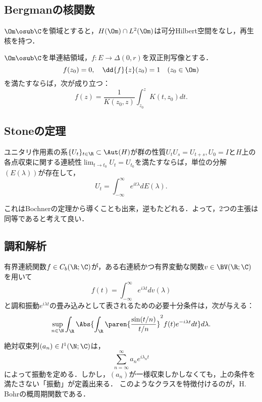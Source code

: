 \documentclass[uplatex,dvipdfmx]{jsreport}
\begin{document}
\subsection{Bergmanの核関数}

\begin{definition}
    $\Om\osub\C$を領域とすると，$H(\Om)\cap L^2(\Om)$は可分Hilbert空間をなし，再生核を持つ．
\end{definition}

\begin{theorem}
    $\Om\osub\C$を単連結領域，$f:E\to\Delta(0,r)$を双正則写像とする．
    \[f(z_0)=0,\quad\dd{f}{z}(z_0)=1\quad(z_0\in\Om)\]
    を満たすならば，次が成り立つ：
    \[f(z)=\frac{1}{K(z_0,z)}\int^z_{z_0}K(t,z_0)dt.\]
\end{theorem}

\subsection{Stoneの定理}

\begin{theorem}[Stone]
    ユニタリ作用素の系$\{U_t\}_{t\in\R}\subset\Aut(H)$が群の性質$U_tU_s=U_{t+s},U_0=I$と$H$上の各点収束に関する連続性$\lim_{t\to t_0}U_t=U_{t_0}$を満たすならば，単位の分解$(E(\lambda))$が存在して，
    \[U_t=\int^\infty_{-\infty}e^{it\lambda}dE(\lambda).\]
\end{theorem}
\begin{remarks}
    これはBochnerの定理から導くことも出来，逆もたどれる．よって，2つの主張は同等であると考えて良い\cite{吉田}．
\end{remarks}

\subsection{調和解析}

\begin{theorem}
    有界連続関数$f\in C_b(\R;\C)$が，ある右連続かつ有界変動な関数$v\in\BV(\R;\C)$を用いて
    \[f(t)=\int^\infty_{-\infty}e^{i\lambda t}dv(\lambda)\]
    と調和振動$e^{i\lambda t}$の畳み込みとして表されるための必要十分条件は，次が与える：
    \[\sup_{n\in\N}\int_\R\Abs{\int_\R\paren{\frac{\sin(t/n)}{t/n}}^2f(t)e^{-i\lambda t}dt}d\lambda.\]
\end{theorem}
\begin{remarks}
    絶対収束列$(a_n)\in l^1(\N;\C)$は，
    \[\sum_{n=\infty}^\infty a_ne^{i\lambda_nt}\]
    によって振動を定める．しかし，$(a_n)$が一様収束しかしなくても，上の条件を満たさない「振動」が定義出来る．
    このようなクラスを特徴付けるのが，H. Bohrの概周期関数である．
\end{remarks}
\end{document}
